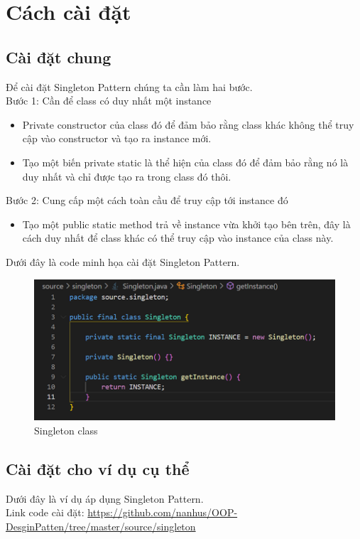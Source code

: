 \section{Cách cài đặt}
\subsection{Cài đặt chung}
Để cài đặt Singleton Pattern chúng ta cần làm hai bước.\\
Bước 1: Cần để class có duy nhất một instance
\begin{itemize}
    \item Private constructor của class đó để đảm bảo rằng class khác không thể truy cập vào constructor và tạo ra instance mới.
    \item Tạo một biến private static là thể hiện của class đó để đảm bảo rằng nó là duy nhất và chỉ được tạo ra trong class đó thôi.
\end{itemize}
Bước 2: Cung cấp một cách toàn cầu để truy cập tới instance đó
\begin{itemize}
    \item Tạo một public static method trả về instance vừa khởi tạo bên trên, đây là cách duy nhất để class khác có thể truy cập vào instance của class này.
\end{itemize}

Dưới đây là code minh họa cài đặt Singleton Pattern.

\begin{figure}[!htb]
    \centering
    \includegraphics[width=\textwidth]
    {fig/Singleton/singleton_class.png}
    \caption{Singleton class}
    \label{fig:Singleton Class}
\end{figure}

\subsection{Cài đặt cho ví dụ cụ thể}
Dưới đây là ví dụ áp dụng Singleton Pattern.\\
Link code cài đặt:
\url{https://github.com/nanhus/OOP-DesginPatten/tree/master/source/singleton}

